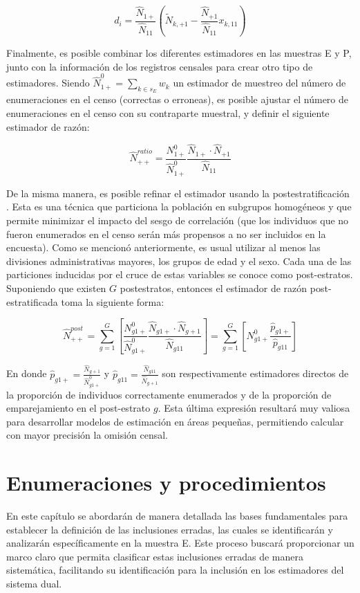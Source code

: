 \documentclass[
  12pt,
]{book}
\begin{document}
\[
d_i = \frac{\hat{N}_{1+}}{\hat{N}_{11}} 
\left(\tilde{N}_{k, +1} - \frac{\hat{N}_{+1}}{\hat{N}_{11}}x_{k, 11}\right)  
\]

Finalmente, es posible combinar los diferentes estimadores en las muestras E y P, junto con la información de los registros censales para crear otro tipo de estimadores. Siendo \(\hat{N}_{1+}^0 = \sum_{k \in s_E}w_k\) un estimador de muestreo del número de enumeraciones en el censo (correctas o erroneas), es posible ajustar el número de enumeraciones en el censo con su contraparte muestral, y definir el siguiente estimador de razón:

\[
\hat{N}_{++}^{ratio} = \frac{N_{1+}^0}{\hat{N}_{1+}^0} \frac{\hat{N}_{1+} \cdot \hat{N}_{+1}}{\hat{N}_{11}}
\]

De la misma manera, es posible refinar el estimador usando la postestratificación \citep{Gutierrez_2016}. Esta es una técnica que particiona la población en subgrupos homogéneos y que permite minimizar el impacto del sesgo de correlación (que los individuos que no fueron enumerados en el censo serán más propensos a no ser incluidos en la encuesta). Como se mencionó anteriormente, es usual utilizar al menos las divisiones administrativas mayores, los grupos de edad y el sexo. Cada una de las particiones inducidas por el cruce de estas variables se conoce como post-estratos. Suponiendo que existen \(G\) postestratos, entonces el estimador de razón post-estratificada toma la siguiente forma:

\[
\hat{N}_{++}^{post} = \sum_{g=1}^G \left[ \frac{N_{g1+}^0}{\hat{N}_{g1+}^0} \frac{\hat{N}_{g1+} \cdot \hat{N}_{g+1}}{\hat{N}_{g11}} \right] =
\sum_{g=1}^G \left[N_{g1+}^0 \frac{\hat{p}_{g1+}}{\hat{p}_{g11}}  \right]
\]

En donde \(\hat{p}_{g1+} = \frac{\hat{N}_{g+1}}{\hat{N}_{g1+}^0}\) y \(\hat{p}_{g11} = \frac{\hat{N}_{g11}}{\hat{N}_{g+1}}\) son respectivamente estimadores directos de la proporción de individuos correctamente enumerados y de la proporción de emparejamiento en el post-estrato \(g\). Esta última expresión resultará muy valiosa para desarrollar modelos de estimación en áreas pequeñas, permitiendo calcular con mayor precisión la omisión censal.

\chapter{Enumeraciones y procedimientos}\label{cap3}

En este capítulo se abordarán de manera detallada las bases fundamentales para establecer la definición de las inclusiones erradas, las cuales se identificarán y analizarán específicamente en la muestra E. Este proceso buscará proporcionar un marco claro que permita clasificar estas inclusiones erradas de manera sistemática, facilitando su identificación para la inclusión en los estimadores del sistema dual.
\end{document}
